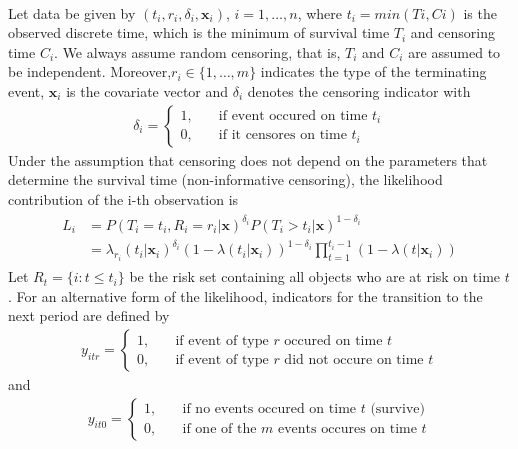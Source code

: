 \documentclass[]{article}
\begin{document}
    \paragraph{}Let data be given by $(t_i,r_i,\delta_i, \mathbf{x}_i)$, $i = 1,\dots,n$, where $t_i = min(Ti,Ci)$ is the observed discrete time, which is the minimum of survival time $T_i$ and censoring time $C_i$. We always
    assume random censoring, that is, $T_i$ and $C_i$ are assumed to be independent. Moreover,$r_i \in \{1,\dots,m\}$ indicates the type of the terminating event, $\mathbf{x}_i$ is the covariate vector and $\delta_i$ denotes the censoring indicator with
    \begin{align}
        \delta_i = \begin{cases}
        1, &\quad \text{if event occured on time }t_i \\
        0, &\quad \text{if it censores on time }t_i
        \end{cases}
    \end{align}
    Under the assumption that censoring does not depend on the parameters that determine
    the survival time (non-informative censoring), the likelihood contribution of the i-th observation is
    \begin{align}
    \begin{split}
        L_i &= P(T_i = t_i,R_i = r_i|\mathbf{x})^{\delta_i}P(T_i > t_i|\mathbf{x})^{1-\delta_i}  \\
        &=\lambda_{r_i}(t_i|\mathbf{x}_i)^{\delta_i}
          (1-\lambda(t_i|\mathbf{x}_i))^{1-\delta_i}
          \prod_{t=1}^{t_i-1}(1-\lambda(t|\mathbf{x}_i)) \label{log liklihood using delta}
    \end{split}
    \end{align}
    Let $R_t = \{i : t \leq t_i\}$ be the risk set containing all objects who are at risk on time $t$. For an alternative form of the likelihood, indicators for the transition to the
    next period are defined by
    \begin{align}
        y_{itr} = \begin{cases}
            1, &\quad \text{if event of type }r\text{ occured on time }t \\
            0, &\quad \text{if event of type }r\text{ did not occure on time }t
        \end{cases}
    \end{align}
    and
    \begin{align}
    y_{it0} = \begin{cases}
    1, &\quad \text{if no events occured on time }t \text{ (survive)} \\
    0, &\quad \text{if one of the } m\text{ events occures on time }t
    \end{cases}
    \end{align}
\end{document}
